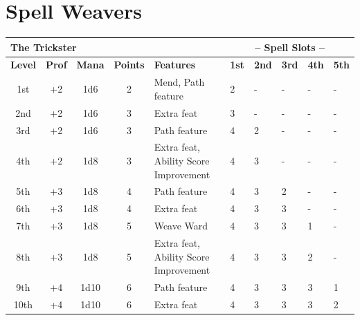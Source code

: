 \chapter{Spell Weavers}




\begin{table}[ht!]
\begin{small}
\begin{center}
\begin{tabular}{ccccllllll}
\multicolumn{5}{l}{\parbox[l][0.6cm][c]{8cm}{\textbf{The Trickster}}} & 
\multicolumn{5}{c}{\textbf{-- Spell Slots --}}
\\
\hline 
\textbf{Level} & \textbf{Prof} & \textbf{Mana} & \textbf{Points} & \parbox[l][0.6cm][c]{8cm}{\textbf{Features}} & \textbf{1st} & \textbf{2nd} & \textbf{3rd} & \textbf{4th} & \textbf{5th}
\\ 
1st & +2 & 1d6 & 2 & \parbox[l][0.6cm][c]{8cm}{Mend, Path feature} & 2 & - & - & - & -
\\
2nd & +2 & 1d6 & 3 & \parbox[l][0.6cm][c]{8cm}{Extra feat} & 3 & - & - & - & -
\\
3rd & +2 & 1d6 & 3 & \parbox[l][0.6cm][c]{8cm}{Path feature} & 4 & 2 & -& - & -
\\
4th & +2 & 1d8 & 3 & \parbox[l][0.6cm][c]{8cm}{Extra feat, Ability Score Improvement} & 4 & 3 & - & - & -
\\
5th & +3 & 1d8 & 4 & \parbox[l][0.6cm][c]{8cm}{Path feature} & 4 & 3 & 2 & - & -
\\
6th & +3 & 1d8 & 4 & \parbox[l][0.6cm][c]{8cm}{Extra feat} & 4 & 3 & 3 & - & -
\\
7th & +3 & 1d8 & 5 & \parbox[l][0.6cm][c]{8cm}{Weave Ward} & 4 & 3 & 3 & 1 & -
\\
8th & +3 & 1d8 & 5 & \parbox[l][0.6cm][c]{8cm}{Extra feat, Ability Score Improvement} & 4 & 3 & 3 & 2 & -
\\
9th & +4 & 1d10 & 6 & \parbox[l][0.6cm][c]{8cm}{Path feature} & 4 & 3 & 3 & 3 & 1 
\\
10th & +4 & 1d10 & 6 & \parbox[l][0.6cm][c]{8cm}{Extra feat} & 4 & 3 & 3 & 3 & 2 
\\

\hline
\end{tabular}
\end{center}
\end{small}
\end{table}


